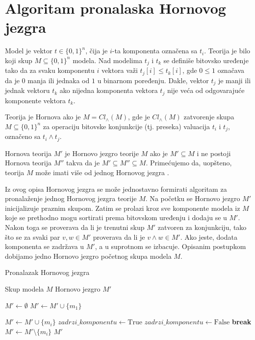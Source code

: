 \documentclass[12pt,oneside]{memoir}
\begin{document}
\section{Algoritam pronalaska Hornovog jezgra}

Model je vektor $t \in \{0,1\}^n$, čija je $i$-ta komponenta označena sa $t_i$. Teorija je bilo koji skup $M \subseteq \{0,1\}^n$ modela. Nad modelima $t_j$ i $t_k$ se definiše bitovsko uređenje tako da za svaku komponentu $i$ vektora važi $t_j[i] \leq t_k[i]$, gde $0 \leq 1$ označava da je $0$ manja ili jednaka od $1$ u binarnom poređenju. Dakle, vektor $t_j$ je manji ili jednak vektoru $t_k$ ako nijedna komponenta vektora $t_j$ nije veća od odgovarajuće komponente vektora $t_k$.

Teorija je Hornova ako je $M = Cl_{\land}(M)$, gde je $Cl_{\land}(M)$ zatvorenje skupa $M \subseteq \{0,1\}^n$ za operaciju bitovske konjunkcije (tj. preseka) valuacija $t_i$ i $t_j$, označeno sa $t_i \land t_j$.

Hornova teorija $M'$ je Hornovo jezgro teorije $M$ ako je $M' \subseteq M$ i ne postoji Hornova teorija $M''$ takva da je $M' \subseteq M'' \subseteq M$. Primećujemo da, uopšteno, teorija $M$ može imati više od jednog Hornovog jezgra \cite{doc1}.

Iz ovog opisa Hornovog jezgra se može jednostavno formirati algoritam za pronalaženje jednog Hornovog jezgra teorije $M$. Na početku se Hornovo jezgro $M'$ inicijalizuje praznim skupom. Zatim se prolazi kroz sve komponente modela iz $M$ koje se prethodno mogu sortirati prema bitovskom uređenju i dodaju se u $M'$. Nakon toga se proverava da li je trenutni skup $M'$ zatvoren za konjunkciju, tako što se za svaki par $v, w \in M'$ proverava da li je $v \land w \in M'$. Ako jeste, dodata komponenta se zadržava u $M'$, a u suprotnom se izbacuje. Opisanim postupkom dobijamo jedno Hornovo jezgro početnog skupa modela $M$.\\

\begin{algorithm}
    \caption{Pronalazak Hornovog jezgra}
    \renewcommand{\algorithmicrequire}{\textbf{Ulaz:}}
    \renewcommand{\algorithmicensure}{\textbf{Izlaz:}}
    \begin{algorithmic}[1]
        \REQUIRE Skup modela $M$
        \ENSURE Hornovo jezgro $M'$
    
        \STATE $M' \gets \emptyset$ 
        \STATE $M' \gets M' \cup \{m_1\}$
    
            \STATE $M' \gets M' \cup \{m_i\}$
            \STATE $zadrzi\_komponentu \gets \text{True}$
                    \STATE $zadrzi\_komponentu \gets \text{False}$
                    \STATE \textbf{break}
                \ENDIF
            \ENDFOR
                \STATE $M' \gets M' \setminus \{ m_i \}$
            \ENDIF
        \ENDFOR
        \RETURN $M'$
        \end{algorithmic}
\end{algorithm}
\end{document}
